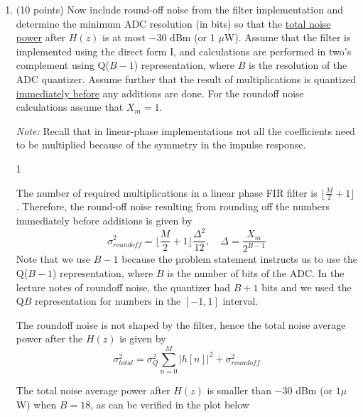 \documentclass[10pt]{article}
\def\SOLUTIONS{0} %
\def\SolutionsColor{red2}
\begin{document}
\begin{enumerate}[label=(\alph*)]
{		Slightly different results may be obtained for different filters.
	}\fi
	
	\item (10 points) Now include round-off noise from the filter implementation and determine the minimum ADC resolution (in bits) so that the \underline{total noise power} after $H(z)$ is at most $-30$ dBm (or 1 $\mu$W). Assume that the filter is implemented using the direct form I, and calculations are performed in two's complement using Q($B-1$) representation, where $B$ is the resolution of the ADC quantizer. Assume further that the result of multiplications is quantized \underline{immediately before} any additions are done. For the roundoff noise calculations assume that $X_m = 1$.
	
	\noindent\textit{Note:} Recall that in linear-phase implementations not all the coefficients need to be multiplied because of the symmetry in the impulse response.
	
	\if\SOLUTIONS1 {\color{\SolutionsColor} The number of required multiplications in a linear phase FIR filter is $\lfloor \frac{M}{2} + 1 \rfloor$. Therefore, the round-off noise resulting from rounding off the numbers immediately before additions is given by
		\begin{equation*}
		\sigma_{roundoff}^2 = \Big\lfloor \frac{M}{2} + 1 \Big\rfloor\frac{\Delta^2}{12}, \quad\Delta = \frac{X_m}{2^{B-1}}
		\end{equation*}
		Note that we use $B-1$ because the problem statement instructs us to use the Q($B-1$) representation, where $B$ is the number of bits of the ADC. In the lecture notes of roundoff noise, the quantizer had $B+1$ bits and we used the Q$B$ representation for numbers in the $[-1, 1]$ interval. 
		
		The roundoff noise is not shaped by the filter, hence the total noise average power after the $H(z)$ is given by
		\begin{equation*}
		\sigma^2_{total} = \sigma_Q^2\sum_{n = 0}^{M}|h[n]|^2 + \sigma_{roundoff}^2
		\end{equation*}
		
		The total noise average power after $H(z)$ is smaller than $-30$ dBm (or $1 \mu$W) when $B = 18$, as can be verified in the plot below
		
}
\end{enumerate}
\end{document}
